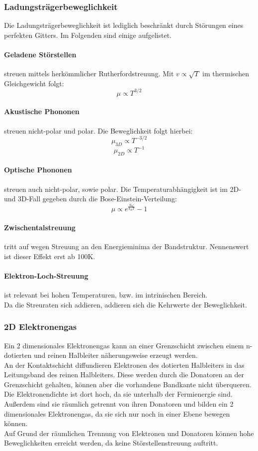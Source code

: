 \subsubsection{Ladungsträgerbeweglichkeit}
Die Ladungsträgerbeweglichkeit ist lediglich beschränkt durch Störungen eines perfekten Gitters. Im Folgenden sind einige aufgelistet.\\
\paragraph{Geladene Störstellen} streuen mittels herkömmlicher Rutherfordstreuung. Mit $v \propto \sqrt{T}$ im thermischen Gleichgewicht folgt:
$$\mu \propto T^{3/2} $$
\paragraph{Akustische Phononen} streuen nicht-polar und polar. Die Beweglichkeit folgt hierbei:
$$\mu _{3D} \propto T^{-3/2} $$
$$\mu _{2D} \propto T^{-1} $$
\paragraph{Optische Phononen} streuen auch nicht-polar, sowie polar. Die Temperaturabhängigkeit ist im 2D- und 3D-Fall gegeben durch die Bose-Einstein-Verteilung:
$$\mu \propto e^{\frac{\hbar \omega}{k_B T}} -1 $$
\paragraph{Zwischentalstreuung} tritt auf wegen Streuung an den Energieminima der Bandstruktur. Nennenswert ist dieser Effekt erst ab 100K.
\paragraph{Elektron-Loch-Streuung} ist relevant bei hohen Temperaturen, bzw. im intrinischen Bereich.\\
\newline
Da die Streuraten sich addieren, addieren sich die Kehrwerte der Beweglichkeit.

\subsubsection{2D Elektronengas}
Ein 2 dimensionales Elektronengas kann an einer Grenzschicht zwischen einem n-dotierten und reinen Halbleiter näherungsweise erzeugt werden.\\
An der Kontaktschicht diffundieren Elektronen des dotierten Halbleiters in das Leitungsband des reinen Halbleiters. Diese werden durch die Donatoren an der Grenzschicht gehalten, können aber die vorhandene Bandkante nicht überqueren. Die Elektronendichte ist dort hoch, da sie unterhalb der Fermienergie sind. Außerdem sind sie räumlich getrennt von ihren Donatoren und bilden ein 2 dimensionales Elektronengas, da sie sich nur noch in einer Ebene bewegen können.\\
Auf Grund der räumlichen Trennung von Elektronen und Donatoren können hohe Beweglichkeiten erreicht werden, da keine Störstellenstreuung auftritt.
